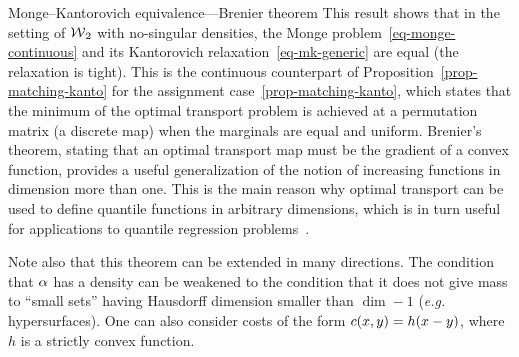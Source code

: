 \begin{rem2}{Monge--Kantorovich equivalence---Brenier theorem}
This result shows that in the setting of $\operatorname{\mathcal{W}}_2$ with no-singular densities, the Monge problem~\eqref{eq-monge-continuous} and its Kantorovich relaxation~\eqref{eq-mk-generic} are equal (the relaxation is tight). This is the continuous counterpart of Proposition~\ref{prop-matching-kanto} for the assignment case~\eqref{prop-matching-kanto}, which states that the minimum of the optimal transport problem is achieved at a permutation matrix (a discrete map) when the marginals are equal and uniform.
%
Brenier's theorem, stating that an optimal transport map must be the gradient of a convex function, provides a useful generalization of the notion of increasing functions in dimension more than one. This is the main reason why optimal transport can be used to define quantile functions in arbitrary dimensions, which is in turn useful for applications to quantile regression problems~\citep{carlier2016vector}.

Note also that this theorem can be extended in many directions.
%
The condition that $\alpha$ has a density can be weakened to the condition that it does not give mass to ``small sets'' having Hausdorff dimension smaller than $\dim-1$ (\emph{e.g.} hypersurfaces).
%
One can also consider costs of the form $c(x,y)=h(x-y)$, where $h$ is a strictly convex function.
\end{rem2}


